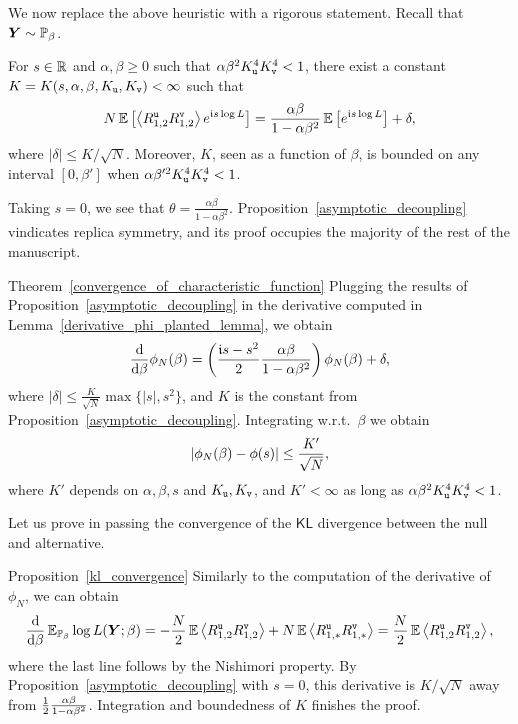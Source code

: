 \documentclass[final,12pt]{colt2018} %
\newcommand{\KL}{\mathsf{KL}}
\newcommand{\utt}{\textup{\texttt{u}}}
\newcommand{\vtt}{\textup{\texttt{v}}}
\newcommand{\Y}{\bm{Y}}
\begin{document}
We now replace the above heuristic with a rigorous statement. Recall that $\Y \sim \P_{\beta}$.
\begin{proposition}\label{asymptotic_decoupling}
For $s \in \mathbb{R}$ and $\alpha,\beta \ge 0$ such that $\alpha\beta^2K_{\utt}^4K_{\vtt}^4<1$, there exist a constant $K = K(s,\alpha,\beta,K_{\utt},K_{\vtt}) <\infty$ such that 
\[N\E\left[\left\langle R^{\utt}_{1,2}R^{\vtt}_{1,2}\right\rangle e^{\imnb s \log L}\right] = \frac{\alpha \beta}{1-\alpha\beta^2}\E\left[e^{\imnb s \log L}\right]+ \delta,\] 
where $|\delta| \le K/\sqrt{N}$.
Moreover, $K$, seen as a function of $\beta$, is bounded on any interval $[0,\beta']$ when $\alpha\beta'^2K_{\utt}^4K_{\vtt}^4<1$. 
\end{proposition}

Taking $s=0$, we see that $\theta =  \frac{\alpha \beta}{1-\alpha\beta^2}$. Proposition~\ref{asymptotic_decoupling} vindicates replica symmetry, and its proof occupies the majority of the rest of the manuscript. 

\vspace{.2cm}  
\noindent\begin{proofof}{Theorem~\ref{convergence_of_characteristic_function}}
Plugging the results of Proposition~\ref{asymptotic_decoupling} in the derivative computed in Lemma~\ref{derivative_phi_planted_lemma}, we obtain
\[\frac{\mathrm{d}}{\mathrm{d} \beta} \phi_N(\beta) = \left(\frac{\mathfrak{i} s - s^2}{2}\frac{\alpha \beta}{1-\alpha\beta^2}\right)\phi_N(\beta) + \delta,\]
where $|\delta| \le \frac{K}{\sqrt{N}}\max\{|s|,s^2\}$, and $K$ is the constant from Proposition~\ref{asymptotic_decoupling}. 
Integrating w.r.t.\ $\beta$ we obtain
\[\left|\phi_N(\beta) - \phi(s)\right| \le \frac{K'}{\sqrt{N}},\]
where $K'$ depends on $\alpha,\beta,s$ and $K_{\utt},K_{\vtt}$, and $K' <\infty$ as long as $\alpha\beta^2 K_{\utt}^4K_{\vtt}^4<1$. 
\end{proofof}

\vspace{.2cm}
Let us prove in passing the convergence of the $\KL$ divergence between the null and alternative. 

\vspace{.1cm}
\noindent\begin{proofof}{Proposition~\ref{kl_convergence}}
Similarly to the computation of the derivative of $\phi_N$, we can obtain
\[\frac{\rmd}{\rmd \beta} \E_{\P_{\beta}}\log L(\Y;\beta) =  -\frac{N}{2} \E\left \langle R^{\utt}_{1,2}R^{\vtt}_{1,2}\right \rangle
+N \E\left \langle R^{\utt}_{1,*}R^{\vtt}_{1,*}\right \rangle = \frac{N}{2} \E\left \langle R^{\utt}_{1,2}R^{\vtt}_{1,2}\right \rangle,\]
where the last line follows by the Nishimori property. By Proposition~\ref{asymptotic_decoupling} with $s=0$, this derivative is $K/\sqrt{N}$ away from $\frac{1}{2}\frac{\alpha \beta}{1-\alpha\beta^2}$. Integration and boundedness of $K$ finishes the proof. 
\end{proofof}
\end{document}
